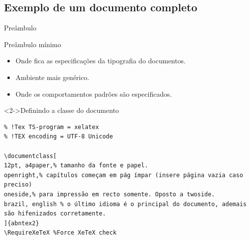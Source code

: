 \documentclass[bigger]{beamer}
\begin{document}
{\subsection{Exemplo de um documento completo}
\label{sec:org220dff4}
\begin{frame}[label={sec:org35edb1b},fragile]{Preâmbulo}
 \begin{block}{Preâmbulo mínimo}
\begin{itemize}
\item Onde fica as especificações da tipografia do documentos.
\item Ambiente mais genérico.
\item Onde os comportamentos padrões são especificados.
\end{itemize}
\end{block}

\begin{block}<2->{Definindo a classe do documento}
\begin{verbatim}
% !Tex TS-program = xelatex
% !TEX encoding = UTF-8 Unicode

\documentclass[
12pt, a4paper,% tamanho da fonte e papel.
openright,% capítulos começam em pág ímpar (insere página vazia caso preciso)
oneside,% para impressão em recto somente. Oposto a twoside.
brazil, english	% o último idioma é o principal do documento, ademais são hifenizados corretamente.
]{abntex2}
\RequireXeTeX %Force XeTeX check
\end{verbatim}
\end{block}
\end{frame}

}
\end{document}
